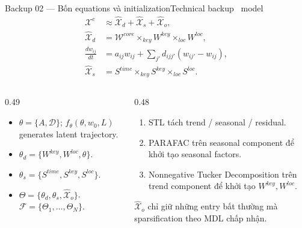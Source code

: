 \begin{frame}[shrink=44]{Backup 02 --- Bốn equations và initialization}{Technical backup \textperiodcentered\ model}
\small
\begin{align}
  \mathcal X^c&\approx\widehat{\mathcal X}_d+\widehat{\mathcal X}_s+\widehat{\mathcal X}_o,\\
  \widehat{\mathcal X}_d&=\mathcal W^{core}\times_{key}W^{key}\times_{loc}W^{loc},\\
  \frac{dw_{ij}}{dt}&=a_{ij}w_{ij}+\sum_{j'}d_{ijj'}(w_{ij'}-w_{ij}),\\
  \widehat{\mathcal X}_s&=S^{time}\times_{key}S^{key}\times_{loc}S^{loc}.
\end{align}
\vspace{2mm}
\begin{columns}[T,onlytextwidth]
\begin{column}{0.49\textwidth}
\begin{mathcard}
  \begin{itemize}
    \item $\theta=\{A,\mathcal D\}$; $f_\theta(\theta,w_0,L)$ generates latent trajectory.
    \item $\theta_d=\{W^{key},W^{loc},\theta\}$.
    \item $\theta_s=\{S^{time},S^{key},S^{loc}\}$.
    \item $\Theta=\{\theta_d,\theta_s,\widehat{\mathcal X}_o\}$.
    $\mathcal F=\{\Theta_1,\ldots,\Theta_N\}$.
  \end{itemize}
\end{mathcard}
\end{column}
\begin{column}{0.48\textwidth}
\begin{intuition}
  \begin{enumerate}
    \item STL tách trend / seasonal / residual.
    \item PARAFAC trên seasonal component để khởi tạo seasonal factors.
    \item Nonnegative Tucker Decomposition trên trend component để khởi tạo $W^{key},W^{loc}$.
  \end{enumerate}
\end{intuition}
\vspace{3mm}
\begin{takeaway}
  $\widehat{\mathcal X}_o$ chỉ giữ những entry bất thường mà sparsification theo MDL chấp nhận.
\end{takeaway}
\end{column}
\end{columns}
\vspace{2mm}
\end{frame}

